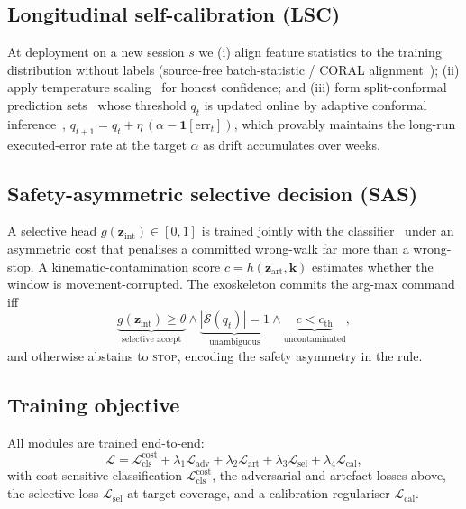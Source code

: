 \documentclass[journal]{IEEEtran}
\begin{document}
\subsection{Longitudinal self-calibration (LSC)}
At deployment on a new session $s$ we (i) align feature statistics to the training
distribution without labels (source-free batch-statistic / CORAL
alignment~\cite{sun2016}); (ii) apply temperature scaling~\cite{guo2017} for honest
confidence; and (iii) form split-conformal prediction sets~\cite{angelopoulos2023}
whose threshold $q_t$ is updated online by adaptive conformal
inference~\cite{gibbs2021},
$q_{t+1}=q_t+\eta\,(\alpha-\mathbf{1}[\text{err}_t])$,
which provably maintains the long-run executed-error rate at the target $\alpha$ as
drift accumulates over weeks.

\subsection{Safety-asymmetric selective decision (SAS)}
A selective head $g(\mathbf{z}_{\mathrm{int}})\in[0,1]$ is trained jointly with the
classifier~\cite{geifman2019} under an asymmetric cost that penalises a committed
wrong-walk far more than a wrong-stop. A kinematic-contamination score
$c=h(\mathbf{z}_{\mathrm{art}},\mathbf{k})$ estimates whether the window is
movement-corrupted. The exoskeleton commits the arg-max command iff
\[
\underbrace{g(\mathbf{z}_{\mathrm{int}})\!\ge\!\theta}_{\text{selective accept}}\!\wedge\!
\underbrace{|\mathcal{S}(q_t)|\!=\!1}_{\text{unambiguous}}\!\wedge\!
\underbrace{c<c_{\mathrm{th}}}_{\text{uncontaminated}},
\]
and otherwise abstains to \textsc{stop}, encoding the safety asymmetry in the rule.

\subsection{Training objective}
All modules are trained end-to-end:
\begin{equation}
\mathcal{L}=\mathcal{L}_{\mathrm{cls}}^{\mathrm{cost}}
+\lambda_1\mathcal{L}_{\mathrm{adv}}
+\lambda_2\mathcal{L}_{\mathrm{art}}
+\lambda_3\mathcal{L}_{\mathrm{sel}}
+\lambda_4\mathcal{L}_{\mathrm{cal}},
\end{equation}
with cost-sensitive classification $\mathcal{L}_{\mathrm{cls}}^{\mathrm{cost}}$, the
adversarial and artefact losses above, the selective loss
$\mathcal{L}_{\mathrm{sel}}$ at target coverage, and a calibration regulariser
$\mathcal{L}_{\mathrm{cal}}$.
\end{document}
